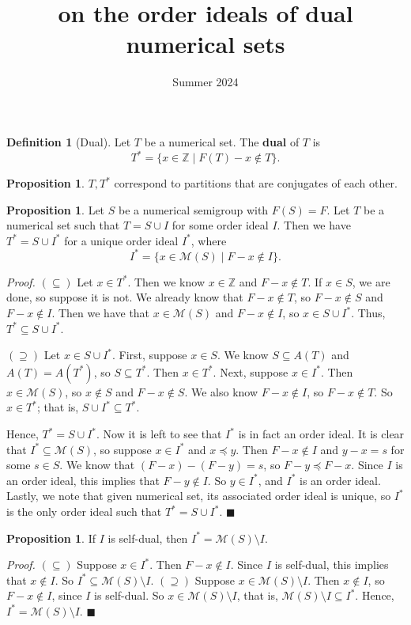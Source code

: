 \documentclass{article}
\title{on the order ideals of dual numerical sets}
\date{Summer 2024}
\theoremstyle{definition}
\theoremstyle{definition}
\newtheorem{defn}[thm]{Definition}
\theoremstyle{definition}
\newtheorem{prop}[thm]{Proposition}
\begin{document}
\maketitle

\begin{defn}[Dual]
    Let $T$ be a numerical set. The \textbf{dual} of $T$ is 
    $$T^* = \{x \in \mathbb{Z} \mid F(T) - x \notin T \}.$$
\end{defn}

\begin{prop}
    $T, T^*$ correspond to partitions that are conjugates of each other. 
\end{prop}

\begin{prop}
    Let $S$ be a numerical semigroup with $F(S) = F$. Let $T$ be a numerical set such that $T = S\cup I$ for some order ideal $I$. Then we have $T^* = S\cup I^*$ for a unique order ideal $I^*$, where 
    $$I^* = \{x \in \mathcal{M}(S) \mid F - x \notin I\}.$$

    \textit{Proof.} $(\subseteq)$ Let $x \in T^*$. Then we know $x\in \mathbb{Z}$ and $F-x \notin T$. If $x\in S$, we are done, so suppose it is not. We already know that $F-x \notin T$, so $F-x \notin S$ and $F-x \notin I$. Then we have that $x \in \mathcal{M}(S)$ and $F-x \notin I$, so $x \in S \cup I^*$. Thus, $T^* \subseteq S\cup I^*$.

    $(\supseteq)$ Let $x \in S\cup I^*$. First, suppose $x \in S$. We know $S \subseteq A(T)$ and $A(T) = A(T^*)$, so $S \subseteq T^*$. Then $x \in T^*$. Next, suppose $x \in I^*$. Then $x \in \mathcal{M}(S)$, so $x \notin S$ and $F-x \notin S$. We also know $F-x \notin I$, so $F-x \notin T$. So $x\in T^*$; that is, $S\cup I^* \subseteq T^*$. 
    
    Hence, $T^*= S \cup I^*$. Now it is left to see that $I^*$ is in fact an order ideal. It is clear that $I^* \subseteq \mathcal{M}(S)$, so suppose $x \in I^*$ and $x \preceq y$. Then $F-x \notin I$ and $y-x = s$ for some $s \in S$. We know that $(F-x) - (F-y) = s$, so $F-y \preceq F-x$. Since $I$ is an order ideal, this implies that $F-y \notin I$. So $y \in I^*$, and $I^*$ is an order ideal. Lastly, we note that given numerical set, its associated order ideal is unique, so $I^*$ is the only order ideal such that $T^* = S\cup I^*$. $\blacksquare$
    
\end{prop}

\begin{prop}
    If $I$ is self-dual, then $I^* = \mathcal{M}(S) \setminus I$.
    \medskip

    \textit{Proof.} $(\subseteq)$ Suppose $x \in I^*$. Then $F-x \notin I$. Since $I$ is self-dual, this implies that $x \notin I$. So $I^* \subseteq \mathcal{M}(S)\setminus I$. $(\supseteq)$ Suppose $x \in \mathcal{M}(S)\setminus I$. Then $x \notin I$, so $F-x \notin I$, since $I$ is self-dual. So $x \in \mathcal{M}(S) \setminus I$, that is, $\mathcal{M}(S) \setminus I \subseteq I^*$. Hence, $I^* = \mathcal{M}(S) \setminus I$. $\blacksquare$
    
\end{prop}
\end{document}

